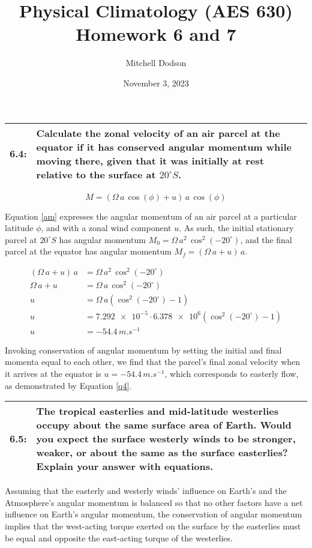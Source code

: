 \documentclass[12pt]{article}
\title{Physical Climatology (AES 630) Homework 6 and 7}
\author{Mitchell Dodson}
\date{November 3, 2023}
\newcommand*{\problem}[2]{
    \begin{table}[ht]
    \centering
        \begin{tabular}{ | p{.1\linewidth} p{.9\linewidth} | }
            \hline
            \vspace{.3em}\textbf{\large#1:} & \vspace{.3em}\small{#2}\hspace{.2em}\vspace{.5em} \\ \hline
        \end{tabular}
    \end{table}
}
\begin{document}
\maketitle

\problem{6.4}{
    Calculate the zonal velocity of an air parcel at the equator if it has conserved angular momentum while moving there, given that it was initially at rest relative to the surface at $20^\circ S$.
} %

\begin{equation}\label{am}
    M = (\Omega \, a \, \cos(\phi) + u) \, a \, \cos(\phi)
\end{equation}

Equation \ref{am} expresses the angular momentum of an air parcel at a particular latitude $\phi$, and with a zonal wind component $u$. As such, the initial stationary parcel at $20^\circ S$ has angular momentum $M_0 = \Omega \, a^2 \, \cos^2(-20^\circ)$, and the final parcel at the equator has angular momentum $M_f = (\Omega \, a + u) \, a$.

\begin{equation}\label{q4}
    \begin{split}
        (\Omega \, a + u) \, a &= \Omega \, a^2 \, \cos^2(-20^\circ) \\
        \Omega \, a + u &= \Omega \, a \, \cos^2(-20^\circ) \\
        u &= \Omega \, a ( \cos^2(-20^\circ) - 1 ) \\
        u &= \num{7.292e-5} \cdot \num{6.378e6} ( \cos^2(-20^\circ) - 1 ) \\
        u &= -54.4 \,\si{m.s^{-1}}
    \end{split}
\end{equation}

Invoking conservation of angular momentum by setting the initial and final momenta equal to each other, we find that the parcel's final zonal velocity when it arrives at the equator  is $u = -54.4 \,\si{m.s^{-1}}$, which corresponds to easterly flow, as demonstrated by Equation \ref{q4}.


\problem{6.5}{
    The tropical easterlies and mid-latitude westerlies occupy about the same surface area of Earth. Would you expect the surface westerly winds to be stronger, weaker, or about the same as the surface easterlies? Explain your answer with equations.
} %

Assuming that the easterly and westerly winds' influence on Earth's and the Atmosphere's angular momentum is balanced so that no other factors have a net influence on Earth's angular momentum, the conservation of angular momentum implies that the west-acting torque exerted on the surface by the easterlies must be equal and opposite the east-acting torque of the westerlies.
\end{document}
